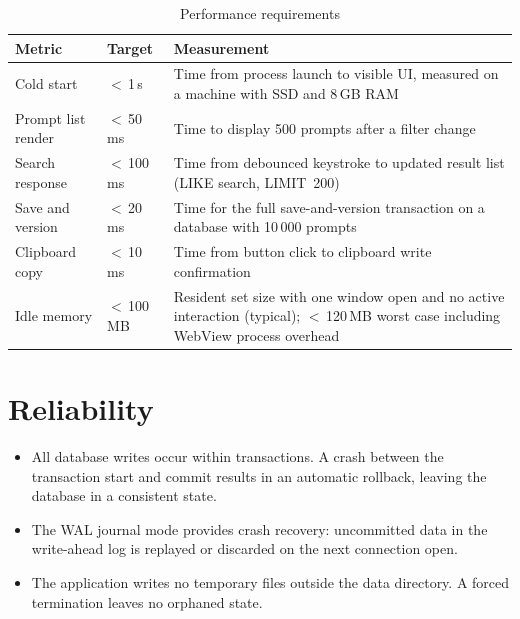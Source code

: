 \documentclass[a4paper, 11pt, oneside]{report}
\begin{document}
\begin{table}[H]
  \centering
  \caption{Performance requirements}
  \label{tab:performance}
  \begin{tabularx}{\textwidth}{l l X}
    \toprule
    \textbf{Metric} & \textbf{Target} & \textbf{Measurement} \\
    \midrule
    Cold start              & $<$\,1\,s    & Time from process launch to visible UI,
                                              measured on a machine with SSD and 8\,GB RAM \\
    Prompt list render      & $<$\,50\,ms  & Time to display 500 prompts after a
                                              filter change \\
    Search response         & $<$\,100\,ms & Time from debounced keystroke to updated
                                              result list (LIKE search, LIMIT~200) \\
    Save and version        & $<$\,20\,ms  & Time for the full save-and-version
                                              transaction on a database with 10\,000 prompts \\
    Clipboard copy          & $<$\,10\,ms  & Time from button click to clipboard
                                              write confirmation \\
    Idle memory             & $<$\,100\,MB & Resident set size with one window open
                                              and no active interaction (typical);
                                              $<$\,120\,MB worst case including
                                              WebView process overhead \\
    \bottomrule
  \end{tabularx}
\end{table}

\section{Reliability}
\label{sec:reliability}

\begin{itemize}
  \item All database writes occur within transactions.  A crash between
        the transaction start and commit results in an automatic rollback,
        leaving the database in a consistent state.
  \item The WAL journal mode provides crash recovery: uncommitted data
        in the write-ahead log is replayed or discarded on the next
        connection open.
  \item The application writes no temporary files outside the data
        directory.  A forced termination leaves no orphaned state.
\end{itemize}
\end{document}
